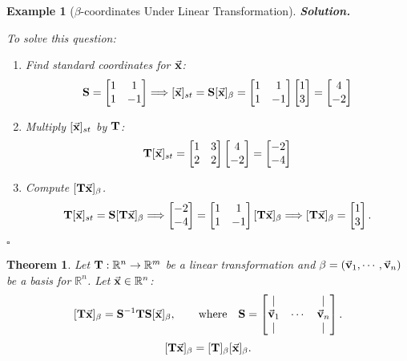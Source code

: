 \documentclass[12pt, a4paper]{article}
\newtheorem{thm}{Theorem}[subsection]
\newtheorem{eg}{Example}[subsection]
\newenvironment*{sol}{\par\indent\textbf{\textit{Solution. }}}{\hfill{$\square$}\par}
\def\R{{\mathbb{R}}}
\def\T{{\vb{T}}}
\def\vecx{\va{x}}
\def\vecv{\va{v}}
\def\matrixS{\vb{S}}
\begin{document}
\begin{eg}[$\beta$-coordinates Under Linear Transformation]
\begin{sol}
\begin{center}
		\end{center}
		To solve this question: 
		\begin{enumerate}
			\item Find standard coordinates for $\vecx$: 
				\[\matrixS=\begin{bmatrix}1&1\\1&-1\end{bmatrix}\Longrightarrow[\vecx]_{st}=\matrixS[\vecx]_\beta=\begin{bmatrix}1&1\\1&-1\end{bmatrix}\begin{bmatrix}1\\3\end{bmatrix}=\begin{bmatrix}4\\-2\end{bmatrix}\]
			\item Multiply $[\vecx]_{st}$ by $\T$: 
				\[\T[\vecx]_{st}=\begin{bmatrix}1 & 3\\2 & 2\end{bmatrix}\begin{bmatrix}4\\-2\end{bmatrix}=\begin{bmatrix}-2\\-4\end{bmatrix}\]
			\item Compute $[\T\vecx]_\beta$.
				\[\T[\vecx]_{st}=\matrixS[\T\vecx]_\beta\Longrightarrow\begin{bmatrix}-2\\-4\end{bmatrix}=\begin{bmatrix}1&1\\1&-1\end{bmatrix}[\T\vecx]_\beta\Longrightarrow[\T\vecx]_\beta=\begin{bmatrix}1\\3\end{bmatrix}.\]
		\end{enumerate}
	\end{sol}
\end{eg}
\begin{thm}
	Let $\T: \R^n\to\R^m$ be a linear transformation and $\beta=(\vecv_1,\cdots,\vecv_n)$ be a basis for $\R^n$. Let $\vecx\in\R^n$: \[[\T\vecx]_\beta=\matrixS^{-1}\T\matrixS[\vecx]_\beta,\qquad\text{where}\quad\matrixS=\begin{bmatrix}|&&|\\\vecv_1&\cdots&\vecv_n\\|&&|\end{bmatrix}.\] 	\[[\T\vecx]_\beta=[\T]_\beta[\vecx]_\beta.\]
\end{thm}
\end{document}
